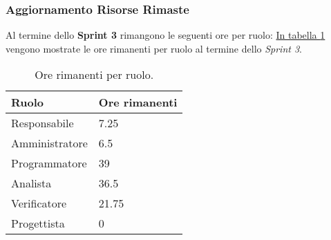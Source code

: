 \subsubsection{Aggiornamento Risorse Rimaste}
\label{sec:AggiornamentoRisorse_Sprint3}
Al termine dello \textbf{Sprint 3} rimangono le seguenti ore per ruolo: \hyperref[tab:sprint3_ore_rimanenti]{In tabella \ref{tab:sprint3_ore_rimanenti}} vengono mostrate le ore rimanenti per ruolo al termine dello \textit{Sprint 3}.

\begin{table}[H]
    \centering
    \begin{tabular}{| l | l |}
    \hline
    \textbf{Ruolo} & 
    \textbf{Ore rimanenti}\\
    \hline
        Responsabile & 7.25\\
    \hline
        Amministratore & 6.5\\
    \hline
        Programmatore & 39\\
    \hline
        Analista & 36.5\\
    \hline
        Verificatore & 21.75\\
    \hline
        Progettista & 0\\
    \hline
    \end{tabular}
    \caption{Ore rimanenti per ruolo.}
    \label{tab:sprint3_ore_rimanenti} 
\end{table}
